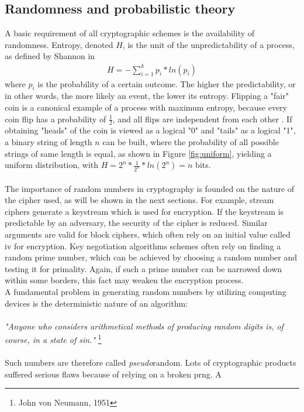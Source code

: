 \subsection{Randomness and probabilistic theory}
A basic requirement of all cryptographic schemes is the availability of randomness. Entropy, denoted $H$, is the unit of the unpredictability of a process, as
 defined by Shannon in \cite{6773024}
 \begin{align}
 H = - \sum_{i=1}^{k} p_i* ln(p_i)
\end{align}
where $p_i$ is the probability of a certain outcome.
The higher the predictability, or in other words, the more likely an event, the lower its entropy. Flipping a "fair" coin is a canonical 
example of a process with maximum entropy, because every coin flip has a probability of $\frac{1}{2}$, and all flips are independent from each other \cite{1621063}.
If obtaining "heads" of the coin is viewed as a logical "0" and "tails" as a logical "1", a binary string of length $n$ can be built, where the probability of all possible
strings of same length is equal, as shown in Figure \ref{fig:uniform}, yielding a uniform distribution, with
$H = 2^n*\frac{1}{2^n}*ln(2^n) = n$ bits. 
\\
\\
The importance of random numbers in cryptography is founded on the nature of the cipher used, as will be shown in the next sections. For example,
stream ciphers generate a keystream which is used
for encryption. If the keystream is predictable by an adversary, the security of the cipher is reduced. Similar arguments are valid for block ciphers, which often
rely on an initial value called \gls{iv} for encryption. Key negotiation algorithms schemes often rely on finding a random prime number, which can be 
achieved by choosing a random number and testing it for primality. Again, if such a prime number can be narrowed down within some borders, this fact may
weaken the encryption process.
\\
A fundamental problem in generating random numbers by utilizing computing devices is the deterministic nature of an algorithm:
\\
\\
\textit{"Anyone who considers arithmetical methods of producing random digits is, of course, in a state of sin."} \footnote{John von Neumann, 1951}
\\
\\
Such numbers are therefore called \textit{pseudo}random. Lots of cryptographic products suffered serious flaws because of relying on a broken \gls{prng}. A 
